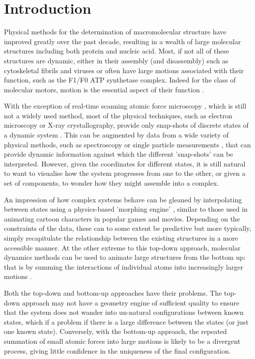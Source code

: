 \section{Introduction}

Physical methods for the determination of macromolecular structure have
improved greatly over the past decade, resulting in a wealth of large
molecular structures including both protein and nucleic acid.   Most,
if not all of these structures are dynamic, either in their assembly
(and disassembly) such as cytoskeletal fibrils and viruses or often have
large motions associated with their function, such as the F1/F0 ATP
synthetase complex.  Indeed for the class of molecular motors, motion
is the essential aspect of their function \cite{SpudichJA94,AstumianRD01}.

With the exception of real-time scanning atomic force microscopy \cite{KoderaNet10}, which
is still not a widely used method, most of the physical techniques, such
as electron microscopy or X-ray crystallography, provide only snap-shots
of discrete states of a dynamic system \cite{CoureuxPDet04,BershitskySYet09}.   This can be augmented by data
from a wide variety of physical methods, such as spectroscopy or single
particle measurements \cite{ForkeyJNet03,VeigelCet05}, that can provide dynamic information against
which the different 'snap-shots' can be interpreted.   However, given the
coordinates for different states, it is still natural to want to visualise 
how the system progresses from one to the other, or given a set of components,
to wonder how they might assemble into a complex.

An impression of how complex systems behave can be gleaned by interpolating
between states using a physics-based 'morphing engine' \cite{KrebsWGet00}, similar
to those used in animating cartoon characters in popular games and movies. 
Depending on the constraints of the data, these can to some extent be predictive
but more typically, simply recapitulate the relationship between the existing 
structures in a more accessible manner.   At the other extreme to this
top-down approach, molecular dynamics methods can be used to animate large
structures from the bottom up:  that is by summing the interactions of
individual atoms into increasingly larger motions \cite{SchlickT02,BurghardtTPet07,KawakuboTet09}.

Both the top-down and bottom-up approaches have their problems.  The top-down
approach may not have a geometry engine of sufficient quality to ensure that
the system does not wander into un-natural configurations between known
states, which if a problem if there is a large difference between the states
(or just one known state).    Conversely, with the bottom-up approach, the
repeated summation of small atomic forces into large motions is likely to
be a divergent process, giving little confidence in the uniqueness of
the final configuration.

